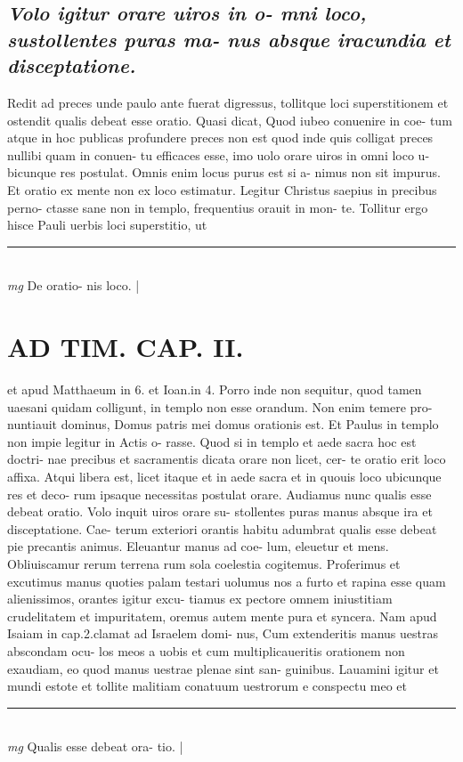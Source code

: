\documentclass{article}
\begin{document}
\begin{pages}
\subsection*{\textit{Volo igitur orare uiros in o- mni loco, sustollentes puras ma- nus absque iracundia et disceptatione. }}\pstart Redit ad preces unde paulo ante fuerat digressus, tollitque loci superstitionem et ostendit qualis debeat esse oratio. Quasi dicat, Quod iubeo conuenire in coe- tum atque in hoc publicas profundere preces non est quod inde quis colligat preces nullibi quam in conuen- tu efficaces esse, imo uolo orare uiros in omni loco u- bicunque res postulat. Omnis enim locus purus est si a- nimus non sit impurus. Et oratio ex mente non ex loco estimatur. Legitur Christus saepius in precibus perno- ctasse sane non in templo, frequentius orauit in mon- te. Tollitur ergo hisce Pauli uerbis loci superstitio, ut  \pend
\vspace{0.5cm}\noindent
\vspace{0.2cm}\rule{1cm}{0.2pt}\\ 
\hspace{0.2cm}\textit{mg}
\footnotesize De oratio- nis loco. 
\normalsize| 
\section*{AD TIM. CAP. II. }
\marginpar{[ p.119 ]}\pstart et apud Matthaeum in 6. et Ioan.in 4. Porro inde non sequitur, quod tamen uaesani quidam colligunt, in templo non esse orandum. Non enim temere pro- nuntiauit dominus, Domus patris mei domus orationis est. Et Paulus in templo non impie legitur in Actis o- rasse. Quod si in templo et aede sacra hoc est doctri- nae precibus et sacramentis dicata orare non licet, cer- te oratio erit loco affixa. Atqui libera est, licet itaque et in aede sacra et in quouis loco ubicunque res et deco- rum ipsaque necessitas postulat orare. Audiamus nunc qualis esse debeat oratio. Volo inquit uiros orare su- stollentes puras manus absque ira et disceptatione. Cae- terum exteriori orantis habitu adumbrat qualis esse debeat pie precantis animus. Eleuantur manus ad coe- lum, eleuetur et mens. Obliuiscamur rerum terrena rum sola coelestia cogitemus. Proferimus et excutimus manus quoties palam testari uolumus nos a furto et rapina esse quam alienissimos, orantes igitur excu- tiamus ex pectore omnem iniustitiam crudelitatem et impuritatem, oremus autem mente pura et syncera. Nam apud Isaiam in cap.2.clamat ad Israelem domi- nus, Cum extenderitis manus uestras abscondam ocu- los meos a uobis et cum multiplicaueritis orationem non exaudiam, eo quod manus uestrae plenae sint san- guinibus. Lauamini igitur et mundi estote et tollite malitiam conatuum uestrorum e conspectu meo et  \pend
\vspace{0.5cm}\noindent
\vspace{0.2cm}\rule{1cm}{0.2pt}\\ 
\hspace{0.2cm}\textit{mg}
\footnotesize Qualis esse debeat ora- tio. 
\normalsize| 

\end{pages}
\end{document}
